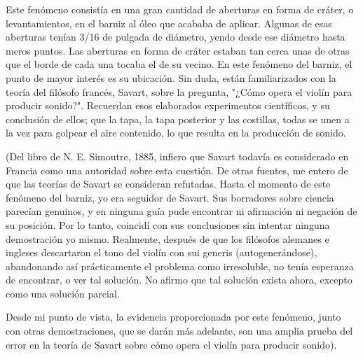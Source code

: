 \documentclass[12pt]{book}
\begin{document}
Este fenómeno consistía en una gran cantidad de aberturas en forma de cráter, o levantamientos, en el barniz al óleo que acababa de aplicar. Algunas de esas aberturas tenían 3/16 de pulgada de diámetro, yendo desde ese diámetro hasta meros puntos. Las aberturas en forma de cráter estaban tan cerca unas de otras que el borde de cada una tocaba el de su vecino. En este fenómeno del barniz, el punto de mayor interés es su ubicación. Sin duda, están familiarizados con la teoría del filósofo francés, Savart, sobre la pregunta, "¿Cómo opera el violín para producir sonido?". Recuerdan esos elaborados experimentos científicos, y su conclusión de ellos; que la tapa, la tapa posterior y las costillas, todas se unen a la vez para golpear el aire contenido, lo que resulta en la producción de sonido.

(Del libro de N. E. Simoutre, 1885, infiero que Savart todavía es considerado en Francia como una autoridad sobre esta cuestión. De otras fuentes, me entero de que las teorías de Savart se consideran refutadas. Hasta el momento de este fenómeno del barniz, yo era seguidor de Savart. Sus borradores sobre ciencia parecían genuinos, y en ninguna guía pude encontrar ni afirmación ni negación de su posición. Por lo tanto, coincidí con sus conclusiones sin intentar ninguna demostración yo mismo. Realmente, después de que los filósofos alemanes e ingleses descartaron el tono del violín con sui generis (autogenerándose), abandonando así prácticamente el problema como irresoluble, no tenía esperanza de encontrar, o ver tal solución. No afirmo que tal solución exista ahora, excepto como una solución parcial.

Desde mi punto de vista, la evidencia proporcionada por este fenómeno, junto con otras demostraciones, que se darán más adelante, son una amplia prueba del error en la teoría de Savart sobre cómo opera el violín para producir sonido).
\end{document}
